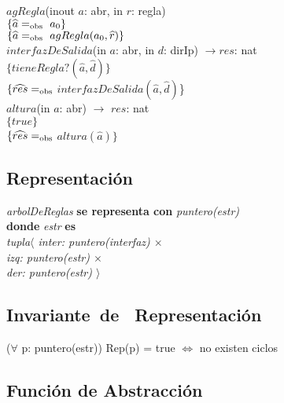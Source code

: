 $agRegla$(inout $a$: abr, in $r$: regla)\\
$\{\widehat{a} =_{\mathrm{obs}}\ a_0\}$\\
$\{\widehat{a} \igobs\ agRegla(a_0,\widehat{r})\}$\\

$interfazDeSalida$(in $a$: abr, in $d$: dirIp) $\longrightarrow res$: nat\\
$\{tieneRegla?(\widehat{a},\widehat{d})\}$\\
$\{\widehat{res}=_{\mathrm{obs}}$ $interfazDeSalida(\widehat{a},\widehat{d})$\}\\

$altura$(in $a$: abr) $\longrightarrow$	$res$: nat\\
$\{true\}$\\
$\{\widehat{res}=_{\mathrm{obs}}$ $altura(\widehat{a})\}$\\


\subsection*{Representaci\'on}
\textit{arbolDeReglas} \textbf{se representa con} \textit{puntero(estr)}\\
\textbf{donde} \textit{estr} \textbf{es}\\
\textit{tupla$\langle$ inter: puntero(interfaz) $\times$\\
\hspace*{1.1cm}izq: puntero(estr) $\times$\\
\hspace*{1.1cm}der: puntero(estr) $\rangle$}

\subsection*{Invariante\ de \ Representaci\'on}
\textbf{}
\vspace{11pt}
($\forall$ p: puntero(estr)) Rep(p) = true $\Leftrightarrow$ no existen ciclos
\vspace{33pt}

\subsection*{Funci\'on de Abstracci\'on}

